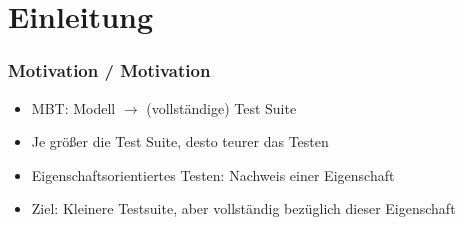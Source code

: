 \section{Einleitung}

\begin{frame}
  \frametitle{Motivation / Motivation}
  \begin{itemize}
    \item MBT: Modell $\rightarrow$ (vollständige) Test Suite
    \item Je größer die Test Suite, desto teurer das Testen
    \item Eigenschaftsorientiertes Testen: Nachweis einer Eigenschaft
    \item Ziel: Kleinere Testsuite, aber vollständig bezüglich dieser Eigenschaft
  \end{itemize}
\end{frame}